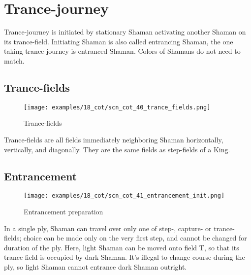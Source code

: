 \section*{Trance-journey}
\label{sec:Conquest of Tlalocan/Trance-journey}

\vspace*{-0.7\baselineskip}
Trance-journey is initiated by stationary Shaman activating another Shaman
on its trance-field. Initiating Shaman is also called entrancing Shaman, the
one taking trance-journey is entranced Shaman.
Colors of Shamans do not need to match.

\vspace*{-0.7\baselineskip}
\subsection*{Trance-fields}
\label{sec:Conquest of Tlalocan/Trance-journey/Trance-fields}

\vspace*{-0.9\baselineskip}
\noindent
\begin{wrapfigure}[5]{l}{0.4\textwidth}
\centering
\texttt{[image: examples/18\_cot/scn\_cot\_40\_trance\_fields.png]}
\vspace*{-0.4\baselineskip}
\caption{Trance-fields}
\label{fig:scn_cot_40_trance_fields}
\end{wrapfigure}
Trance-fields are all fields immediately neighboring Shaman horizontally,
vertically, and diagonally. They are the same fields as step-fields of a King.

\vspace*{2.3\baselineskip}

\subsection*{Entrancement}
\label{sec:Conquest of Tlalocan/Trance-journey/Entrancement}

\vspace*{-0.9\baselineskip}
\noindent
\begin{wrapfigure}[13]{l}{0.4\textwidth}
\centering
\texttt{[image: examples/18\_cot/scn\_cot\_41\_entrancement\_init.png]}
\vspace*{-0.4\baselineskip}
\caption{Entrancement preparation}
\label{fig:scn_cot_41_entrancement_init}
\end{wrapfigure}
In a single ply, Shaman can travel over only one of step-, capture- or trance-fields;
choice can be made only on the very first step, and cannot be changed for duration of
the ply. \newline
\indent
Here, light Shaman can be moved onto field T, so that its trance-field is occupied by
dark Shaman. It's illegal to change course during the ply, so light Shaman cannot
entrance dark Shaman outright.

